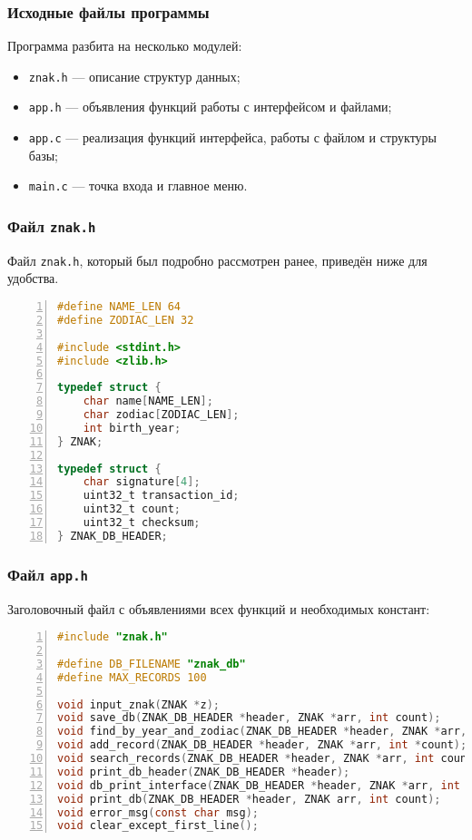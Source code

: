 \vspace{0.5cm}

\subsubsection*{Исходные файлы программы}

Программа разбита на несколько модулей:

\begin{itemize}
    \item \texttt{znak.h} --- описание структур данных;
    \item \texttt{app.h} --- объявления функций работы с интерфейсом и файлами;
    \item \texttt{app.c} --- реализация функций интерфейса, работы с файлом и структуры базы;
    \item \texttt{main.c} --- точка входа и главное меню.
\end{itemize}

\subsubsection*{Файл \texttt{znak.h}}

\noindent
Файл \texttt{znak.h}, который был подробно рассмотрен ранее, приведён ниже для удобства. 

\begin{lstlisting}[language=C, numbers=left, caption=znak.h]
#define NAME_LEN 64
#define ZODIAC_LEN 32

#include <stdint.h>
#include <zlib.h>

typedef struct {
    char name[NAME_LEN];
    char zodiac[ZODIAC_LEN];
    int birth_year;
} ZNAK;

typedef struct {
    char signature[4];
    uint32_t transaction_id;
    uint32_t count;
    uint32_t checksum;
} ZNAK_DB_HEADER;
\end{lstlisting}

\subsubsection*{Файл \texttt{app.h}}

Заголовочный файл с объявлениями всех функций и необходимых констант:

\begin{lstlisting}[language=C, numbers=left, caption=app.h]
#include "znak.h"

#define DB_FILENAME "znak_db"
#define MAX_RECORDS 100

void input_znak(ZNAK *z);
void save_db(ZNAK_DB_HEADER *header, ZNAK *arr, int count);
void find_by_year_and_zodiac(ZNAK_DB_HEADER *header, ZNAK *arr, int count, const char *zodiac, int year);
void add_record(ZNAK_DB_HEADER *header, ZNAK *arr, int *count);
void search_records(ZNAK_DB_HEADER *header, ZNAK *arr, int count);
void print_db_header(ZNAK_DB_HEADER *header);
void db_print_interface(ZNAK_DB_HEADER *header, ZNAK *arr, int count);
void print_db(ZNAK_DB_HEADER *header, ZNAK arr, int count);
void error_msg(const char msg);
void clear_except_first_line();
\end{lstlisting}

